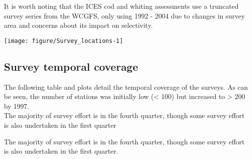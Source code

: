 \documentclass[12pt]{article}\usepackage[]{graphicx}\usepackage[]{color}
\newenvironment{knitrout}{}{} %
\begin{document}
It is worth noting that the ICES cod and whiting assessments use a truncated
survey series from the WCGFS, only using 1992 - 2004 due to changes in survey
area and concerns about its impact on selectivity. \\

\begin{landscape}

\begin{knitrout}\footnotesize
{}\color{fgcolor}
\texttt{[image: figure/Survey\_locations-1]} 

\end{knitrout}

\end{landscape}

\subsection{Survey temporal coverage}

The following table and plots detail the temporal coverage of the surveys. As
can be seen, the number of stations was initially low (< 100) but increased to
> 200 by 1997.\\

The majority of survey effort is in the fourth quarter, though some survey
effort is also undertaken in the first quarter

The majority of survey effort is in the fourth quarter, though some survey
effort is also undertaken in the first quarter. \\ 
\end{document}
